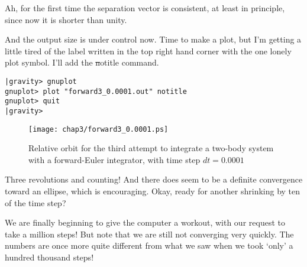 \abc

\bob
Ah, for the first time the separation vector is consistent, at least
in principle, since now it is shorter than unity.

\carol
And the output size is under control now.  Time to make a plot, but
I'm getting a little tired of the label written in the top right hand
corner with the one lonely plot symbol.  I'll add the {\st notitle}
command.

\cba

\begin{small}
\begin{verbatim}
|gravity> gnuplot
gnuplot> plot "forward3_0.0001.out" notitle
gnuplot> quit
|gravity> 
\end{verbatim}
\end{small}

\begin{figure}[ht]
\centering
\texttt{[image: chap3/forward3\_0.0001.ps]}
\caption[Two-body orbit with a forward-Euler integrator, time step
$dt = 0.0001$]
{Relative orbit for the third attempt to integrate a two-body system with a
forward-Euler integrator, with time step $dt = 0.0001$}
\label{fig:forward3-0.0001}
\end{figure}

\abc

\carol
Three revolutions and counting!  And there does seem to be a definite
convergence toward an ellipse, which is encouraging.  Okay, ready for
another shrinking by ten of the time step?

\cba


\abc

\bob
We are finally beginning to give the computer a workout, with our
request to take a million steps!  But note that we are still not
converging very quickly.  The numbers are once more quite different
from what we saw when we took `only' a hundred thousand steps!

\cba

